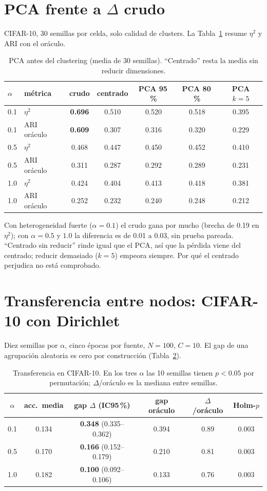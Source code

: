 \documentclass[11pt,a4paper]{article}
\begin{document}
\section{PCA frente a $\Delta$ crudo}
CIFAR-10, 30 semillas por celda, solo calidad de clusters. La Tabla~\ref{tab:pca} resume $\eta^2$ y ARI con el oráculo.

\begin{table}[h]
\centering\small
\begin{tabular}{llccccc}
\toprule
$\alpha$ & métrica & crudo & centrado & PCA 95\,\% & PCA 80\,\% & PCA $k{=}5$\\
\midrule
0.1 & $\eta^2$ & \textbf{0.696} & 0.510 & 0.520 & 0.518 & 0.395\\
0.1 & ARI oráculo & \textbf{0.609} & 0.307 & 0.316 & 0.320 & 0.229\\
0.5 & $\eta^2$ & 0.468 & 0.447 & 0.450 & 0.452 & 0.410\\
0.5 & ARI oráculo & 0.311 & 0.287 & 0.292 & 0.289 & 0.231\\
1.0 & $\eta^2$ & 0.424 & 0.404 & 0.413 & 0.418 & 0.381\\
1.0 & ARI oráculo & 0.252 & 0.232 & 0.240 & 0.248 & 0.212\\
\bottomrule
\end{tabular}
\caption{PCA antes del clustering (media de 30 semillas). ``Centrado'' resta la media sin reducir dimensiones.}
\label{tab:pca}
\end{table}

Con heterogeneidad fuerte ($\alpha=0.1$) el crudo gana por mucho (brecha de 0.19 en $\eta^2$); con $\alpha=0.5$ y $1.0$ la diferencia es de 0.01 a 0.03, sin prueba pareada. ``Centrado sin reducir'' rinde igual que el PCA, así que la pérdida viene del centrado; reducir demasiado ($k=5$) empeora siempre. Por qué el centrado perjudica no está comprobado.

\section{Transferencia entre nodos: CIFAR-10 con Dirichlet}
Diez semillas por $\alpha$, cinco épocas por fuente, $N=100$, $C=10$. El gap de una agrupación aleatoria es cero por construcción (Tabla~\ref{tab:tr}).

\begin{table}[h]
\centering\small
\begin{tabular}{cccccc}
\toprule
$\alpha$ & acc.\ media & gap $\Delta$ (IC95\,\%) & gap oráculo & $\Delta$/oráculo & Holm-$p$\\
\midrule
0.1 & 0.134 & \textbf{0.348} (0.335--0.362) & 0.394 & 0.89 & 0.003\\
0.5 & 0.170 & \textbf{0.166} (0.152--0.179) & 0.210 & 0.81 & 0.003\\
1.0 & 0.182 & \textbf{0.100} (0.092--0.106) & 0.133 & 0.76 & 0.003\\
\bottomrule
\end{tabular}
\caption{Transferencia en CIFAR-10. En los tres $\alpha$ las 10 semillas tienen $p<0.05$ por permutación; $\Delta$/oráculo es la mediana entre semillas.}
\label{tab:tr}
\end{table}
\end{document}
